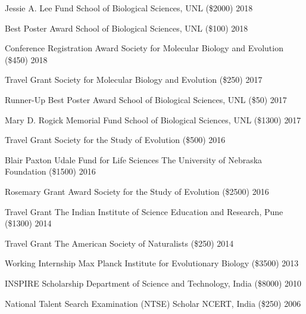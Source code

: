 
\begin{cvhonors}

  \cvhonor
    {Jessie A. Lee Fund} 
    {School of Biological Sciences, UNL (\$2000)}
    {2018} %
    {}

  \cvhonor
    {Best Poster Award}
    {School of Biological Sciences, UNL (\$100)}
    {2018}
    {}

  \cvhonor
    {Conference Registration Award}
    {Society for Molecular Biology and Evolution (\$450)}
    {2018}
    {}

  \cvhonor
    {Travel Grant}
    {Society for Molecular Biology and Evolution (\$250)}
    {2017}
    {}

  \cvhonor
    {Runner-Up Best Poster Award}
    {School of Biological Sciences, UNL (\$50)}
    {2017}
    {}

  \cvhonor
    {Mary D. Rogick Memorial Fund}
    {School of Biological Sciences, UNL (\$1300)}
    {2017}
    {}

  \cvhonor
    {Travel Grant}
    {Society for the Study of Evolution (\$500)}
    {2016}
    {}

  \cvhonor
    {Blair Paxton Udale Fund for Life Sciences}
    {The University of Nebraska Foundation (\$1500)}
    {2016}
    {}

  \cvhonor
    {Rosemary Grant Award}
    {Society for the Study of Evolution (\$2500)}
    {2016}
    {}

  \cvhonor
    {Travel Grant}
    {The Indian Institute of Science Education and Research, Pune (\$1300)}
    {2014}
    {}

  \cvhonor
    {Travel Grant}
    {The American Society of Naturalists (\$250)}
    {2014}
    {}

  \cvhonor
    {Working Internship}
    {Max Planck Institute for Evolutionary Biology (\$3500)}
    {2013}
    {}

  \cvhonor
    {INSPIRE Scholarship}
    {Department of Science and Technology, India (\$8000)}
    {2010}
    {}

  \cvhonor
    {National Talent Search Examination (NTSE) Scholar}
    {NCERT, India (\$250)}
    {2006}
    {}
\end{cvhonors}
